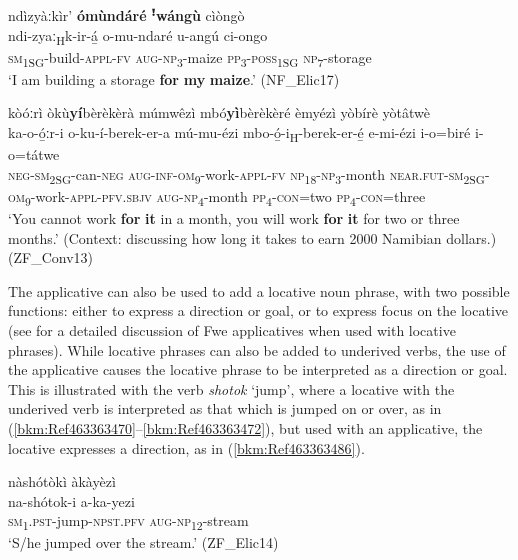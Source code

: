 \ea
ndìzyàːkìr’ \textbf{ómùndáré} \textbf{ꜝ}\textbf{wángù} cìòngò\\
\gll ndi-zyaː\textsubscript{H}k-ir-á̲    o-mu-ndaré    u-angú  ci-ongo\\
\textsc{sm}\textsubscript{1SG}-build-\textsc{appl}-\textsc{fv}  \textsc{aug}-\textsc{np}\textsubscript{3}-maize  \textsc{pp}\textsubscript{3}-\textsc{poss}\textsubscript{1SG}  \textsc{np}\textsubscript{7}-storage\\
\glt ‘I am building a storage \textbf{for} \textbf{my} \textbf{maize}.’ (NF\_Elic17)
\z

\ea
\label{bkm:Ref75170222}
kòóːrì òkù\textbf{yí}bèrèkèrà múmwêzì mbó\textbf{yì}bèrèkèré èmyézì yòbírè yòtâtwè\\
\gll ka-o-ó̲ːr-i      o-ku-í-berek-er-a      mú-mu-ézi mbo-ó̲-i\textsubscript{H}-berek-er-é̲  e-mi-ézi     i-o=biré    i-o=tátwe \\
\textsc{neg}-\textsc{sm}\textsubscript{2SG}-can-\textsc{neg}  \textsc{aug}-\textsc{inf}-\textsc{om}\textsubscript{9}-work-\textsc{appl}-\textsc{fv}  \textsc{np}\textsubscript{18}-\textsc{np}\textsubscript{3}-month
\textsc{near}.\textsc{fut}-\textsc{sm}\textsubscript{2SG}-\textsc{om}\textsubscript{9}-work-\textsc{appl}-\textsc{pfv}.\textsc{sbjv}
\textsc{aug}-\textsc{np}\textsubscript{4}-month   \textsc{pp}\textsubscript{4}-\textsc{con}=two  \textsc{pp}\textsubscript{4}-\textsc{con}=three\\
\glt ‘You cannot work \textbf{for} \textbf{it} in a month, you will work \textbf{for} \textbf{it} for two or three months.’ (Context: discussing how long it takes to earn 2000 Namibian dollars.) (ZF\_Conv13)
\z

The applicative can also be used to add a locative noun phrase, with two possible functions: either to express a direction or goal, or to express focus on the locative (see  \citealt{GunninkPacchiarottiforthcoming} for a detailed discussion of Fwe applicatives when used with locative phrases). While locative phrases can also be added to underived verbs, the use of the applicative causes the locative phrase to be interpreted as a direction or goal. This is illustrated with the verb \textit{shotok} ‘jump’, where a locative with the underived verb is interpreted as that which is jumped on or over, as in (\ref{bkm:Ref463363470}--\ref{bkm:Ref463363472}), but used with an applicative, the locative expresses a direction, as in (\ref{bkm:Ref463363486}).

\ea
\label{bkm:Ref463363470}
nàshótòkì àkàyèzì\\
\gll na-shótok-i      a-ka-yezi\\
\textsc{sm}\textsubscript{1}.\textsc{pst}-jump-\textsc{npst}.\textsc{pfv}  \textsc{aug}-\textsc{np}\textsubscript{12}-stream\\
\glt ‘S/he jumped over the stream.’ (ZF\_Elic14)
\z

